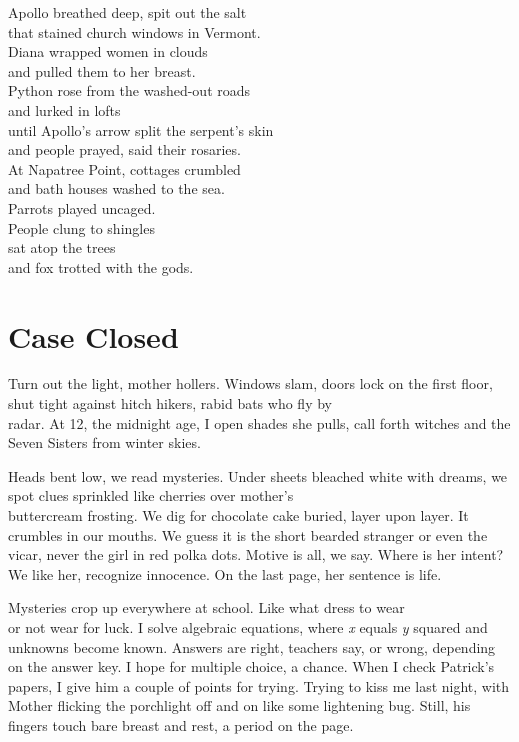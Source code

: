 \documentclass[twoside,10pt]{book}
\begin{document}
Apollo breathed deep, spit out the salt\\
that stained church windows in Vermont.\\
Diana wrapped women in clouds\\
and pulled them to her breast.\\
Python rose from the washed-out roads\\
and lurked in lofts\\
until Apollo's arrow split the serpent's skin\\
and people prayed, said their rosaries.\\
At Napatree Point, cottages crumbled\\
and bath houses washed to the sea.\\
Parrots played uncaged.\\
People clung to shingles\\
sat atop the trees\\
and fox trotted with the gods.


\clearpage
\section{Case Closed}

Turn out the light, mother hollers. Windows slam, doors lock on the
first floor, shut tight against hitch hikers, rabid bats who fly by\\
radar. At 12, the midnight age, I open shades she pulls, call forth
witches and the Seven Sisters from winter skies.

Heads bent low, we read mysteries. Under sheets bleached white with
dreams, we spot clues sprinkled like cherries over mother's\\
buttercream frosting. We dig for chocolate cake buried, layer upon
layer. It crumbles in our mouths. We guess it is the short bearded
stranger or even the vicar, never the girl in red polka dots. Motive is
all, we say. Where is her intent? We like her, recognize innocence. On
the last page, her sentence is life.

Mysteries crop up everywhere at school. Like what dress to wear\\
or not wear for luck. I solve algebraic equations, where \emph{x} equals
\emph{y} squared and unknowns become known. Answers are right, teachers
say, or wrong, depending on the answer key. I hope for multiple choice,
a chance. When I check Patrick's papers, I give him a couple of points
for trying. Trying to kiss me last night, with Mother flicking the
porchlight off and on like some lightening bug. Still, his fingers touch
bare breast and rest, a period on the page.
\end{document}

